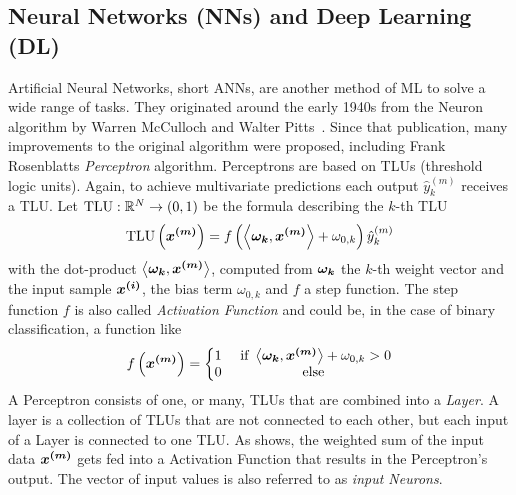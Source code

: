 \subsection{Neural Networks (NNs) and Deep Learning (DL)}\label{subsec:neural-networks}
Artificial Neural Networks, short ANNs, are another method of ML to solve a wide range of tasks.
They originated around the early 1940s from the Neuron algorithm by Warren McCulloch and Walter Pitts~\cite{neuron}.
Since that publication, many improvements to the original algorithm were proposed, including Frank Rosenblatts \textit{Perceptron} algorithm.
Perceptrons are based on TLUs (threshold logic units).
Again, to achieve multivariate predictions each output $\hat{y}_k^{(m)}$ receives a TLU.
Let $\text{TLU}: \mathbb{R}^{N} \rightarrow (0, 1)$ be the formula describing the $k$-th TLU
\begin{align}
    \text{TLU}\left(\bm{x^{(m)}}\right) = f\left(\left\langle\bm{\omega_k}, \bm{x^{(m)}}\right\rangle + \omega_{0,k}\right) \hat{y}_k^{(m)}
    \label{eq:perceptron}
\end{align}
with the dot-product $\left\langle\bm{\omega_k}, \bm{x^{(m)}}\right\rangle$, computed from $\bm{\omega_k}$ the $k$-th weight vector and the input sample $\bm{x^{(i)}}$, the bias term $\omega_{0, k}$ and $f$ a step function.
The step function $f$ is also called \textit{Activation Function} and could be, in the case of binary classification, a function like
\begin{align}
    f\left(\bm{x^{(m)}}\right) =
    \left\{
    \begin{matrix}
        1 & \text{ if } \left\langle\bm{\omega_k}, \bm{x^{(m)}}\right\rangle + \omega_{0,k} > 0\\
        0 & \text{ else }
    \end{matrix}
    \right.
    \label{eq:tlu-activation}
\end{align}
A Perceptron consists of one, or many, TLUs that are combined into a \textit{Layer}.
A layer is a collection of TLUs that are not connected to each other, but each input of a Layer is connected to one TLU.
As  shows, the weighted sum of the input data $\bm{x^{(m)}}$ gets fed into a Activation Function that results in the Perceptron's output.
The vector of input values is also referred to as \textit{input Neurons}.
